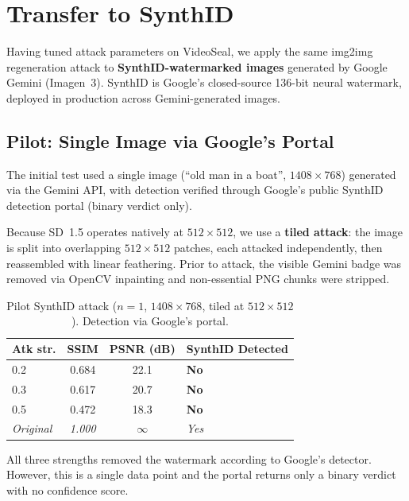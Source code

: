 \documentclass[11pt,a4paper]{article}
\begin{document}
\section{Transfer to SynthID}
\label{sec:synthid}

Having tuned attack parameters on VideoSeal, we apply the same img2img
regeneration attack to \textbf{SynthID-watermarked images} generated by
Google Gemini (Imagen~3). SynthID is Google's closed-source 136-bit neural
watermark, deployed in production across Gemini-generated images.

\subsection{Pilot: Single Image via Google's Portal}
\label{sec:synthid-pilot}

The initial test used a single image (``old man in a boat'', $1408 \times
768$) generated via the Gemini API, with detection verified through
Google's public SynthID detection portal (binary verdict only).

Because SD~1.5 operates natively at $512 \times 512$, we use a
\textbf{tiled attack}: the image is split into overlapping $512 \times 512$
patches, each attacked independently, then reassembled with linear
feathering. Prior to attack, the visible Gemini badge was removed via
OpenCV inpainting and non-essential PNG chunks were stripped.

\begin{table}[h]
\centering
\caption{Pilot SynthID attack ($n = 1$, $1408 \times 768$, tiled at $512
\times 512$). Detection via Google's portal.}
\label{tab:synthid-pilot}
\begin{tabular}{lccl}
\toprule
\textbf{Atk str.} & \textbf{SSIM} & \textbf{PSNR (dB)} & \textbf{SynthID Detected} \\
\midrule
0.2 & 0.684 & 22.1 & \textbf{No} \\
0.3 & 0.617 & 20.7 & \textbf{No} \\
0.5 & 0.472 & 18.3 & \textbf{No} \\
\midrule
\textit{Original} & \textit{1.000} & \textit{$\infty$} & \textit{Yes} \\
\bottomrule
\end{tabular}
\end{table}

All three strengths removed the watermark according to Google's detector.
However, this is a single data point and the portal returns only a binary
verdict with no confidence score.
\end{document}
